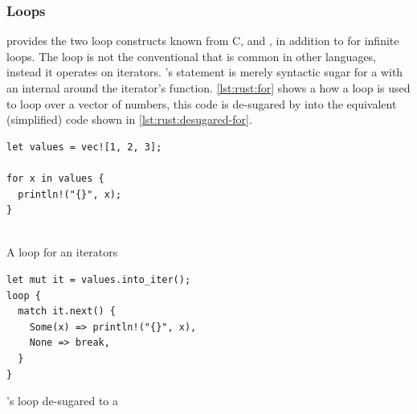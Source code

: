 \subsubsection{Loops}
\label{sec:rust:loops}

{\rust} provides the two loop constructs known from C,  and , in addition to  for infinite loops.
The  loop is not the conventional  that is common in other languages, instead it operates on iterators.
\rust's  statement is merely syntactic sugar for a  with an internal  around the iterator's  function.
\autoref{lst:rust:for} shows a how a  loop is used to loop over a vector of numbers, this code is de-sugared by {\rust} into the equivalent (simplified) code shown in \autoref{lst:rust:desugared-for}.

\begin{listing}[!h]
\begin{minipage}{0.45\textwidth}
  \begin{listing}[H]
    \begin{verbatim}
let values = vec![1, 2, 3];

for x in values {
  println!("{}", x);
}


    \end{verbatim}
    \caption{A  loop for an iterators}
    \label{lst:rust:for}
  \end{listing}
\end{minipage}
\begin{minipage}{0.45\textwidth}
  \begin{listing}[H]
    \begin{verbatim}
let mut it = values.into_iter();
loop {
  match it.next() {
    Some(x) => println!("{}", x),
    None => break,
  }
}
    \end{verbatim}
    \caption{\rust's  loop de-sugared to a }
    \label{lst:rust:desugared-for}
  \end{listing}
\end{minipage}
\end{listing}



